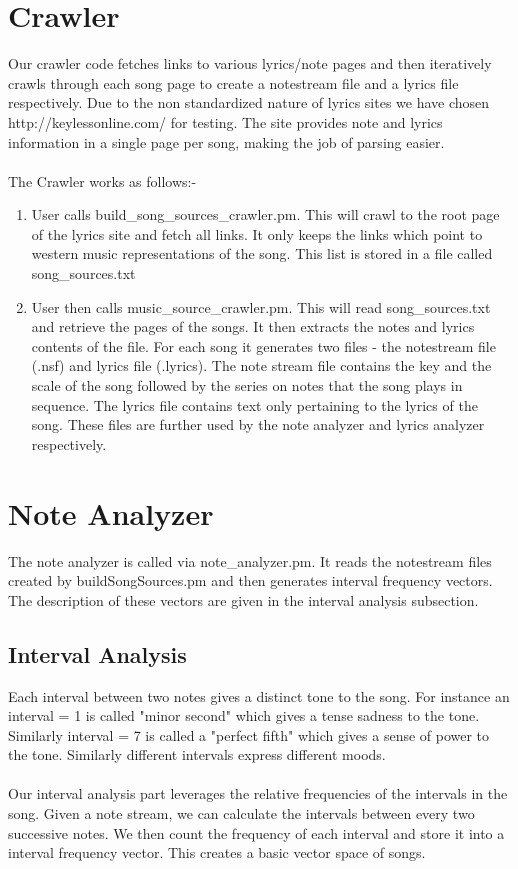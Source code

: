 \documentclass[letterpaper, 11pt]{article}
\begin{document}
\section*{Crawler}
Our crawler code fetches links to various lyrics/note pages and then iteratively crawls through each song page to create a notestream file and a lyrics file respectively. Due to the non standardized nature of lyrics sites we have chosen http://keylessonline.com/ for testing. The site provides note and lyrics information in a single page per song, making the job of parsing easier. \\\\
The Crawler works as follows:-
\begin{enumerate}
\item User calls build\_song\_sources\_crawler.pm. This will crawl to the root page of the lyrics site and fetch all links. It only keeps the links which point to western music representations of the song. This list is stored in a file called song\_sources.txt
\item User then calls music\_source\_crawler.pm. This will read song\_sources.txt and retrieve the pages of the songs. It then extracts the notes and lyrics contents of the file. For each song it generates two files - the notestream file (.nsf) and lyrics file (.lyrics). The note stream file contains the key and the scale of the song followed by the series on notes that the song plays in sequence. The lyrics file contains text only pertaining to the lyrics of the song. These files are further used by the note analyzer and lyrics analyzer respectively. 
\end{enumerate}

\section*{Note Analyzer}
The note analyzer is called via note\_analyzer.pm. It reads the notestream files created by buildSongSources.pm and then generates interval frequency vectors. The description of these vectors are given in the interval analysis subsection.
\subsection*{Interval Analysis}
Each interval between two notes gives a distinct tone to the song. For instance an interval = 1  is called "minor second" which gives a tense sadness to the tone. Similarly interval = 7 is called a "perfect fifth" which gives a sense of power to the tone. Similarly different intervals express different moods. \\\\
Our interval analysis part leverages the relative frequencies of the intervals in the song. Given a note stream, we can calculate the intervals between every two successive notes. We then count the frequency of each interval and store it into a interval frequency vector. This creates a basic vector space of songs. 
\end{document}
